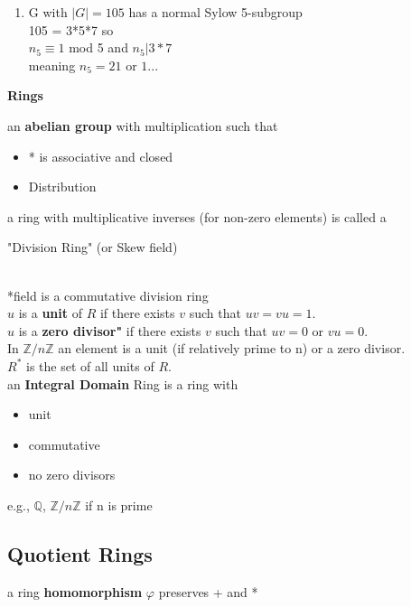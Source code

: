 \documentclass[12pt]{article}
\begin{document}
\begin{enumerate}
    \item G with $|G| = 105$ has a normal Sylow 5-subgroup\\
    \textcolor[gray]{0.5}{105 = 3*5*7 so \\
    $n_5 \equiv 1$ mod 5 and $n_5 | 3*7$\\
    meaning $n_5 = 21$ or $1$...
    }
\end{enumerate}

\centerline{\LARGE \textbf{Rings}}

an \textbf{abelian group} with multiplication such that
\begin{itemize}
    \item * is associative and closed
    \item Distribution
\end{itemize}

a ring with multiplicative inverses (for non-zero elements) is called a \\
\centerline{ "Division Ring" (or Skew field)}
\ \\
*field is a commutative division ring\\

$u$ is a \textbf{unit} of $R$ if there exists $v$ such that $uv = vu = 1$.\\
\indent $u$ is a \textbf{zero divisor"} if there exists $v$ such that $uv=0$ or $vu =0$. \\

In $\mathbb{Z} / n \mathbb{Z}$ an element is a unit (if relatively prime to n) or a zero divisor. \\

$R^*$ is the set of all units of $R$.\\

an \textbf{Integral Domain} Ring is a ring with 
\begin{itemize}
    \item unit
    \item commutative
    \item no zero divisors
\end{itemize}
e.g., $\mathbb{Q}$, $\mathbb{Z} / n \mathbb{Z}$ if n is prime \\



\subsection*{Quotient Rings}

a ring \textbf{homomorphism} $\varphi$ preserves + and * \\
\end{document}
